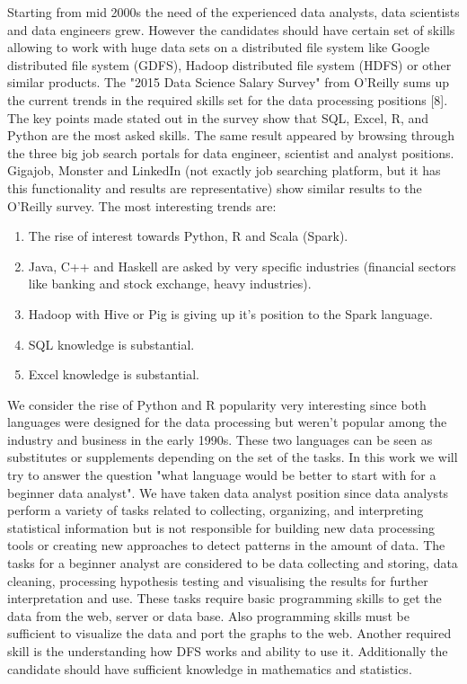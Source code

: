 \documentclass [twoside,
  11pt, a4paper,
  footinclude=true,
  headinclude=true,
  cleardoublepage=empty
]{article}
\begin{document}
Starting from mid 2000s the need of the experienced data analysts, data scientists and data engineers grew. However the candidates should have certain set of skills allowing to work with huge data sets on a distributed file system like Google distributed file system (GDFS), Hadoop distributed file system (HDFS) or other similar products. The "2015 Data Science Salary Survey" from O'Reilly sums up the current trends in the required skills set for the data processing positions [8]. The key points made stated out in the survey show that SQL, Excel, R, and Python are the most asked skills. The same result appeared by browsing through the three big job search portals for data engineer, scientist and analyst positions. Gigajob, Monster and LinkedIn (not exactly job searching  platform, but it has this functionality and results are representative) show similar results to the O'Reilly survey. The most interesting trends are:
\begin{enumerate}
    \item The rise of interest towards Python, R and Scala (Spark).
    \item Java, C++ and Haskell are asked by very specific industries (financial sectors like banking and stock exchange, heavy industries).
    \item Hadoop with Hive or Pig is giving up it's position to the Spark language.
    \item SQL knowledge is substantial.
    \item Excel knowledge is substantial.
\end{enumerate}
We consider the rise of Python and R popularity very interesting since both languages were designed for the data processing but weren't popular among the industry and business in the early 1990s. These two languages can be seen as substitutes or supplements depending on the set of the tasks. In this work we will try to answer the question "what language would be better to start with for a beginner data analyst". We have taken data analyst position since data analysts perform a variety of tasks related to collecting, organizing, and interpreting statistical information but is not responsible for building new data processing tools or creating new approaches to detect patterns in the amount of data. The tasks for a beginner analyst are considered to be data collecting and storing, data cleaning, processing hypothesis testing and visualising the results for further interpretation and use. These tasks require basic programming skills to get the data from the web, server or data base. Also programming skills must be sufficient to visualize the data and port the graphs to the web. Another required skill is the understanding how DFS works and ability to use it. Additionally the candidate should have sufficient knowledge in mathematics and statistics.
\end{document}
